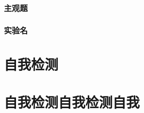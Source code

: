 \documentclass[color=BLUE]{textbook-cn}%
\begin{document}
\lipsum[1-6]
\begin{Improve}
\begin{QsNum}
\item \lipsum[1][1-4]
\item \lipsum[1][1-4]
\item \lipsum[1][1-4]
\item \lipsum[1][1-4]
\item \lipsum[1][1-4]
\item \lipsum[1][1-4]
\item \lipsum[1][1-4]
\item \lipsum[1][1-4]
\end{QsNum}
\begin{QsNum}
\item \lipsum[1][1-4]
\item \lipsum[1][1-4]
\item \lipsum[1][1-4]
\item \lipsum[1][1-4]
\item \lipsum[1][1-4]
\item \lipsum[1][1-4]
\item \lipsum[1][1-4]
\item \lipsum[1][1-4]
\end{QsNum}
\tcblower
\lipsum[1]
\end{Improve}





\begin{Quiz}
\section{主观题}
\end{Quiz}



\begin{Project}
\section{实验名}
\end{Project}


\part*{自我检测}
\part*{自我检测自我检测自我}
\end{document}
